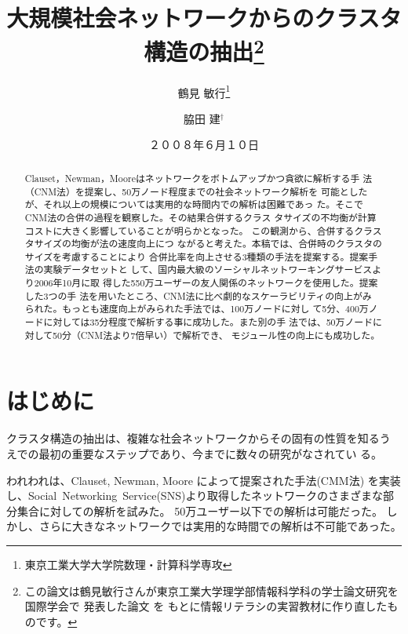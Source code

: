 \documentclass [a4j,11pt] {jsarticle}
\title  {大規模社会ネットワークからのクラスタ構造の抽出\thanks {
  この論文は鶴見敏行さんが東京工業大学理学部情報科学科の学士論文研究を国際学会で
  発表した論文 \protect\cite {wakita-2007-finding-community-structure-in-mega-scale-social}を
  もとに情報リテラシの実習教材に作り直したものです。}}
\author {鶴見 敏行\thanks {東京工業大学大学院数理・計算科学専攻} \and 脇田 建{$^\dagger$}}
\date {２００８年６月１０日}
\begin{document}
\maketitle


\begin {abstract}
Clauset，Newman，Mooreはネットワークをボトムアップかつ貪欲に解析する手
法（CNM法）を提案し、50万ノード程度までの社会ネットワーク解析を
可能としたが、それ以上の規模については実用的な時間内での解析は困難であっ
た。そこでCNM法の合併の過程を観察した。その結果合併するクラス
タサイズの不均衡が計算コストに大きく影響していることが明らかとなった。
この観測から、合併するクラスタサイズの均衡が法の速度向上につ
ながると考えた。本稿では、合併時のクラスタのサイズを考慮することにより
合併比率を向上させる3種類の手法を提案する。提案手法の実験データセットと
して、国内最大級のソーシャルネットワーキングサービスより2006年10月に取
得した550万ユーザーの友人関係のネットワークを使用した。提案した3つの手
法を用いたところ、CNM法に比べ劇的なスケーラビリティの向上がみ
られた。もっとも速度向上がみられた手法では、100万ノードに対し
て5分、400万ノードに対しては35分程度で解析する事に成功した。また別の手
法では、50万ノードに対して50分（CNM法より7倍早い）で解析でき、
モジュール性の向上にも成功した。
\end {abstract}

\section {はじめに}
\label {sect: はじめに}

クラスタ構造の抽出は、複雑な社会ネットワークからその固有の性質を知るう
えでの最初の重要なステップであり、今までに数々の研究がなされてい
る。
\cite{kleinberg-1999-authoritative-sources-in-a-hyperlinked-environment,
  page-1999-the-pagerank-citation-ranking:-bringing-order,
  dean-1999-finding-related-pages-in-the-world-wide,
  kumar-1999-trawling-the-web-for-emerging-cyber-communities,
  miller-2001-modifications-of-kleinbergs-hits-algorithm-using,
  toyoda-2001-creating-a-web-community-chart-for-navigating-related,
  wu-2004-finding-communities-in-linear-time:-a-physics,
  cai-2004-block-level-link-analysis,
  clauset-2004-finding-community-structure-in-very-large,
  onsjo-2006-a-simple-message-passing-algorithm-for-graph}


われわれは、Clauset, Newman, Moore によって提案された手法(CMM法)
\cite{clauset-2004-finding-community-structure-in-very-large}
を実装し、Social~Networking~Service(SNS)より取得したネットワークのさまざまな部分集合に対しての解析を試みた。
50万ユーザー以下での解析は可能だった。
しかし、さらに大きなネットワークでは実用的な時間での解析は不可能であった。
\end{document}
